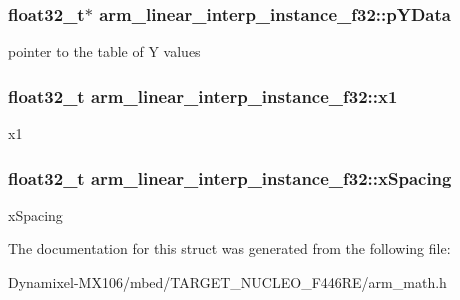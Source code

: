 \subsubsection[{\texorpdfstring{p\+Y\+Data}{pYData}}]{\setlength{\rightskip}{0pt plus 5cm}float32\+\_\+t$\ast$ arm\+\_\+linear\+\_\+interp\+\_\+instance\+\_\+f32\+::p\+Y\+Data}\hypertarget{structarm__linear__interp__instance__f32_ab373001f6afad0850359c344a4d7eee4}{}\label{structarm__linear__interp__instance__f32_ab373001f6afad0850359c344a4d7eee4}
pointer to the table of Y values 
\subsubsection[{\texorpdfstring{x1}{x1}}]{\setlength{\rightskip}{0pt plus 5cm}float32\+\_\+t arm\+\_\+linear\+\_\+interp\+\_\+instance\+\_\+f32\+::x1}\hypertarget{structarm__linear__interp__instance__f32_a08352dc6ea82fbc0827408e018535481}{}\label{structarm__linear__interp__instance__f32_a08352dc6ea82fbc0827408e018535481}
x1 
\subsubsection[{\texorpdfstring{x\+Spacing}{xSpacing}}]{\setlength{\rightskip}{0pt plus 5cm}float32\+\_\+t arm\+\_\+linear\+\_\+interp\+\_\+instance\+\_\+f32\+::x\+Spacing}\hypertarget{structarm__linear__interp__instance__f32_aa8e2d686b5434a406d390b347b183511}{}\label{structarm__linear__interp__instance__f32_aa8e2d686b5434a406d390b347b183511}
x\+Spacing 

The documentation for this struct was generated from the following file\+:\begin{DoxyCompactItemize}
\item 
Dynamixel-\/\+M\+X106/mbed/\+T\+A\+R\+G\+E\+T\+\_\+\+N\+U\+C\+L\+E\+O\+\_\+\+F446\+R\+E/arm\+\_\+math.\+h\end{DoxyCompactItemize}
